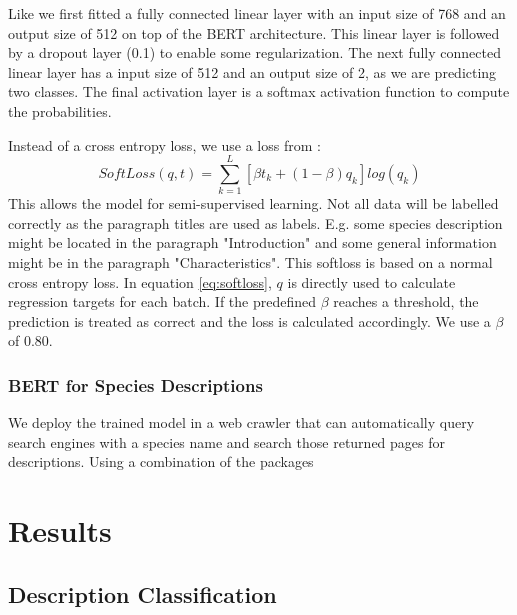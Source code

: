 \documentclass[a4paper, 12pt, oneside]{book} %
\begin{document}
Like \textcite{sun_how_2020} we first fitted a fully connected linear layer with an input size of 768 and an output size of 512 on top of the BERT architecture. 
This linear layer is followed by a dropout layer (0.1) to enable some regularization.
The next fully connected linear layer has a input size of 512 and an output size of 2, as we are predicting two classes.
The final activation layer is a softmax activation function to compute the probabilities.

Instead of a cross entropy loss, we use a loss from \textcite{reed_training_2015}:
\begin{equation} \label{eq:softloss}
 SoftLoss(q, t) = \sum_{k=1}^{L}[\beta t _k + (1- \beta )q _k]log(q _k)
\end{equation}
This allows the model for semi-supervised learning.
Not all data will be labelled correctly as the paragraph titles are used as labels.
E.g. some species description might be located in the paragraph "Introduction" and some general information might be in the paragraph "Characteristics".
This softloss is based on a normal cross entropy loss.
In equation \ref{eq:softloss}, \(q\) is directly used to calculate regression targets for each batch.
If the predefined \(\beta\) reaches a threshold, the prediction is treated as correct and the loss is calculated accordingly.
We use a \(\beta\) of 0.80. 



\subsubsection{BERT for Species Descriptions}
We deploy the trained model in a web crawler that can automatically query search engines with a species name and search those returned pages for descriptions.
Using a combination of the packages 

\section{Results}

\subsection{Description Classification}
\end{document}
